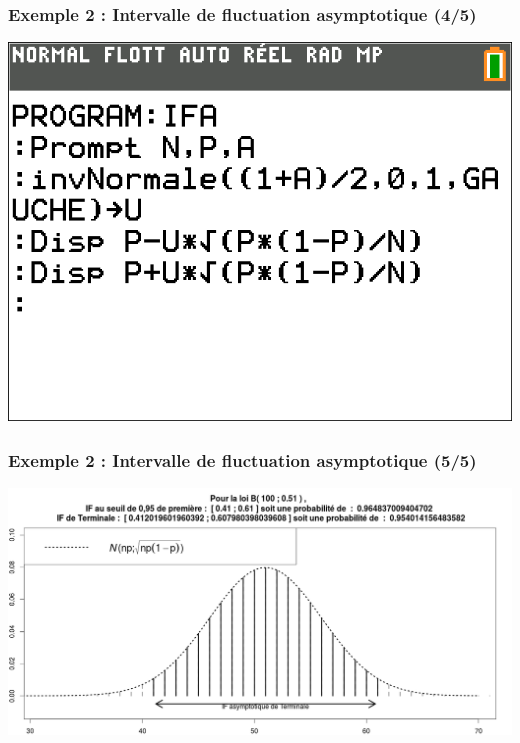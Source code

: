 \documentclass[xcolor=svgnames,t,final]{beamer}
\begin{document}
\begin{frame}

\frametitle{Exemple 2 : Intervalle de fluctuation  asymptotique (4/5)}


\begin{center}
\includegraphics[scale=0.4]{IFA-TI.png}
\end{center}

\end{frame}



\begin{frame}

\frametitle{Exemple 2 : Intervalle de fluctuation  asymptotique (5/5)}

\begin{center}
\includegraphics[scale=0.23]{IFA.png}
\end{center}

\end{frame}
\end{document}
